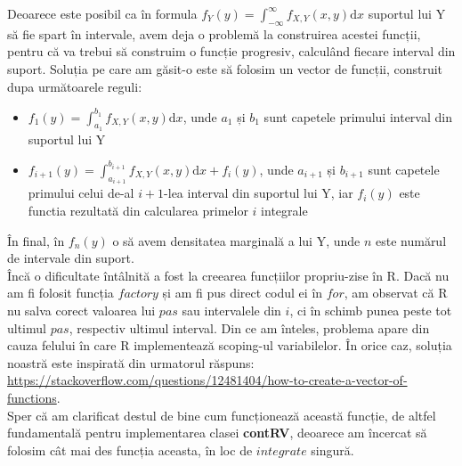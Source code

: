 \documentclass[12pt]{article}
\begin{document}
\indent Deoarece este posibil ca în formula $\displaystyle f_{Y}(y) = \int_{-\infty}^{\infty}f_{X,Y}(x,y)\mathrm{d}x$ suportul lui Y să fie spart în intervale, avem deja o problemă la construirea acestei funcții, pentru că va trebui să construim o funcție progresiv, calculând fiecare interval din suport. Soluția pe care am găsit-o este să folosim un vector de funcții, construit dupa următoarele reguli:
\begin{itemize}
	\item $\displaystyle f_1(y) = \int_{a_1}^{b_1}f_{X,Y}(x,y)\mathrm{d}x$, unde $a_1$ și $b_1$ sunt capetele primului interval din suportul lui Y
	\item $\displaystyle f_{i+1}(y) = \int_{a_{i+1}}^{b_{i+1}} f_{X,Y}(x,y)\mathrm{d}x + f_i(y)$, unde $a_{i+1}$ și $b_{i+1}$ sunt capetele primului celui de-al $i+1$-lea interval din suportul lui Y, iar $f_i(y)$ este functia rezultată din calcularea primelor $i$ integrale
\end{itemize}\pagebreak \par 
În final, în $f_n(y)$ o să avem densitatea marginală a lui Y, unde $n$ este numărul de intervale din suport.\\
\indent Încă o dificultate întâlnită a fost la creearea funcțiilor propriu-zise în R. Dacă nu am fi folosit funcția $factory$ și am fi pus direct codul ei în $for$, am observat că R nu salva corect valoarea lui $pas$ sau intervalele din $i$, ci în schimb punea peste tot ultimul $pas$, respectiv ultimul interval. Din ce am înteles, problema apare din cauza felului în care R implementează scoping-ul variabilelor. În orice caz, soluția noastră este inspirată din urmatorul răspuns: \url{https://stackoverflow.com/questions/12481404/how-to-create-a-vector-of-functions}. \hfill \\
\indent Sper că am clarificat destul de bine cum funcționează această funcție, de altfel fundamentală pentru implementarea clasei \textbf{contRV}, deoarece am încercat să folosim cât mai des funcția aceasta, în loc de $integrate$ singură.\\
\end{document}
